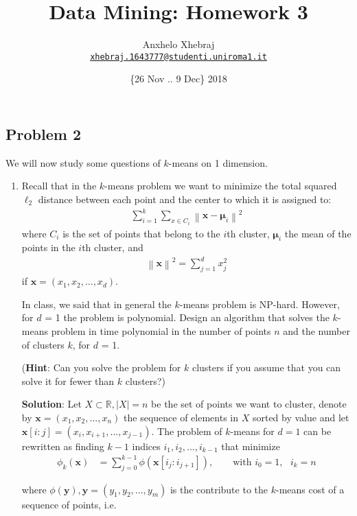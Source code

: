 \documentclass[a4paper]{article}
\title{Data Mining: Homework 3}
\author{Anxhelo Xhebraj \\
        \href{mailto:xhebraj.1643777@studenti.uniroma1.it}{\texttt{xhebraj.1643777@studenti.uniroma1.it}}
        }
\date{ \{26 Nov .. 9 Dec\} 2018}
\newcommand{\norm}[1]{\left\lVert#1\right\rVert}
\begin{document}
\maketitle

\subsection*{Problem 2}

We will now study some questions of $k$-means on 1 dimension.

\begin{enumerate}
  \item Recall that in the $k$-means problem we want to minimize the total
    squared $\ell_2$ distance between each point and the center to which it is
    assigned to:
    \begin{align*}
      \sum_{i = 1}^{k} \sum_{x \in C_i} \norm{\mathbf{x} - \boldsymbol{\mu}_i}^2
    \end{align*}
    where $C_i$ is the set of points that belong to the $i$th cluster,
    $\boldsymbol{\mu}_i$ the mean of the points in the $i$th cluster, and
    \begin{align*}
      \norm{\mathbf{x}}^2 = \sum_{j = 1}^d x_j^2
    \end{align*}
    if $\mathbf{x} = (x_1, x_2, ..., x_d)$.

    In class, we said that in general the $k$-means problem is NP-hard. However,
    for $d$ = 1 the problem is polynomial. Design an algorithm that solves the
    $k$-means problem in time polynomial in the number of points $n$ and the
    number of clusters $k$, for $d$ = 1.

    (\textbf{Hint}: Can you solve the problem for $k$ clusters if you assume
    that you can solve it for fewer than $k$ clusters?)

    \textbf{Solution}: Let $X \subset \mathbb{R}, |X| = n$ be the set of points we want
    to cluster, denote by $\mathbf{x} = (x_1, x_2, ..., x_n)$ the sequence of
    elements in $X$ sorted by value and let $\mathbf{x}[i:j] = (x_i, x_{i + 1},
    ..., x_{j-1}) $.
    The problem of $k$-means for $d = 1$ can be rewritten as finding $k-1$ indices
    $i_1, i_2, ..., i_{k-1}$ that minimize
    \begin{align*}
      \phi_k(\mathbf{x}) &= \sum_{j = 0}^{k - 1} \phi(\mathbf{x}[i_j:i_{j +
      1}]), \qquad \text{with } i_0 = 1, \text{ } i_k = n
    \end{align*}

    where $\phi(\mathbf{y}), \mathbf{y} = (y_1, y_2, ..., y_m)$ is the
    contribute to the $k$-means cost of a sequence of points, i.e.
    

\end{enumerate}
\end{document}

